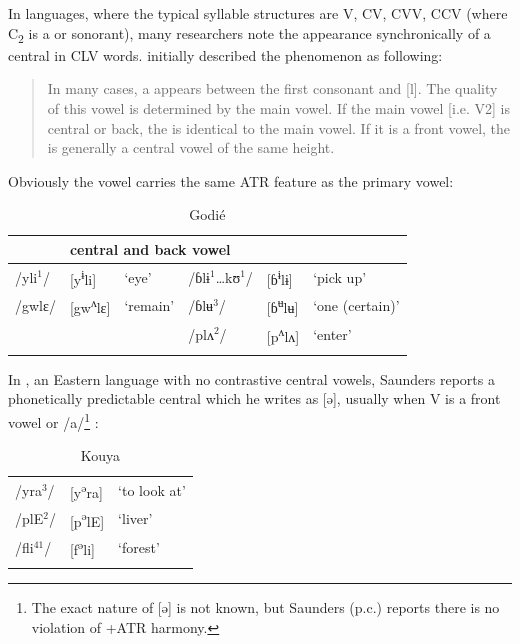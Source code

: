 \documentclass[output=paper
,newtxmath
,modfonts
,nonflat]{langsci/langscibook}
\begin{document}
In  languages, where the typical syllable structures are V, CV, CVV, CCV (where C\textsubscript{2} is a  or sonorant), many researchers note the appearance synchronically of a central  in CLV words.  \citet[98]{Marchese1979/1983} initially described the phenomenon as following:  
\begin{quote}
In many cases, a  appears between the first consonant and [l]. The quality of this vowel is determined by the main vowel.  If the main vowel [i.e. V2] is central or back, the  is identical to the main vowel.  If it is a front vowel, the  is generally a central vowel of the same height. 
\end{quote}

Obviously the vowel carries the same ATR feature as the primary vowel: 

\begin{table}
\label{ex:zogbo:20}
\caption{Godié}
\begin{tabular}{llllll}
\lsptoprule
\multicolumn{3}{l}{front vowel} & \multicolumn{3}{l}{central and back vowel}\\
\midrule
/yli$^1$/  & [y\textsuperscript{ɨ}li]  &  ‘eye’  &  /ɓlɨ$^1$…kʊ$^1$/ & [ɓ\textsuperscript{ɨ}lɨ] & ‘pick up’\\

/gwlɛ/ & [gw\textsuperscript{ʌ}lɛ] & ‘remain’ & /ɓlʉ$^3$/  &  [ɓ\textsuperscript{ʉ}lʉ]  & ‘one (certain)’\\

&&& /plʌ$^2$/  &  [p\textsuperscript{ʌ}lʌ]  & ‘enter’\\
\lspbottomrule
\end{tabular} 
\end{table}

In , an Eastern language with no contrastive central vowels, Saunders reports a phonetically predictable central  which he writes as [ə], {usually when V is a front vowel or /a/}\footnote{The exact nature of [ə] is not known, but Saunders (p.c.) reports there is no violation of +ATR harmony.} {:}

\begin{table}
\caption{Kouya \citep{Saunders2009}}
\label{tab:zogbo:21}
	\begin{tabular}{p{1.5cm}ll}
\lsptoprule
{/yra}{$^3$}{/} &   {[y}{\textsuperscript{ə}}{ra]} & {‘to look at’}\\

{/plE}{$^2$}{/}  &  {[p}{\textsuperscript{ə}}{lE]} & {‘liver’} \\

{/fli}{$^{41}$}{/}  &  {[f}{\textsuperscript{ə}}{li]} & {‘forest’} \\
\lspbottomrule
	\end{tabular}
\end{table}
\end{document}
